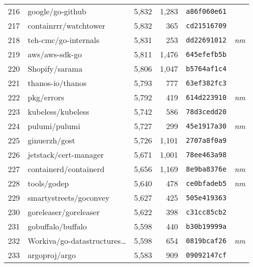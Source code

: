 {\begin{supertabular}{llrrll}
        216 &                   google/go-github &  5,832 &  1,283 &  \texttt{a86f060e61} &              \\
        217 &              containrrr/watchtower &  5,832 &    365 &  \texttt{cd21516709} &              \\
        218 &               teh-cmc/go-internals &  5,831 &    253 &  \texttt{dd22691012} &  \textit{nm} \\
        219 &                     aws/aws-sdk-go &  5,811 &  1,476 &  \texttt{645efefb5b} &              \\
        220 &                     Shopify/sarama &  5,806 &  1,047 &  \texttt{b5764af1c4} &              \\
        221 &                   thanos-io/thanos &  5,793 &    777 &  \texttt{63ef382fc3} &              \\
        222 &                         pkg/errors &  5,792 &    419 &  \texttt{614d223910} &  \textit{nm} \\
        223 &                  kubeless/kubeless &  5,742 &    586 &  \texttt{78d3cedd20} &              \\
        224 &                      pulumi/pulumi &  5,727 &    299 &  \texttt{45e1917a30} &  \textit{nm} \\
        225 &                      ginuerzh/gost &  5,726 &  1,101 &  \texttt{2707a8f0a9} &              \\
        226 &              jetstack/cert-manager &  5,671 &  1,001 &  \texttt{78ee463a98} &              \\
        227 &              containerd/containerd &  5,656 &  1,169 &  \texttt{8e9ba8376e} &  \textit{nm} \\
        228 &                        tools/godep &  5,640 &    478 &  \texttt{ce0bfadeb5} &  \textit{nm} \\
        229 &             smartystreets/goconvey &  5,627 &    425 &  \texttt{505e419363} &              \\
        230 &              goreleaser/goreleaser &  5,622 &    398 &  \texttt{c31cc85cb2} &              \\
        231 &                  gobuffalo/buffalo &  5,598 &    440 &  \texttt{b30b19999a} &              \\
        232 &    Workiva/go-datastructures\ldots &  5,598 &    654 &  \texttt{0819bcaf26} &  \textit{nm} \\
        233 &                      argoproj/argo &  5,583 &    909 &  \texttt{09092147cf} &              \\

\end{supertabular}}
